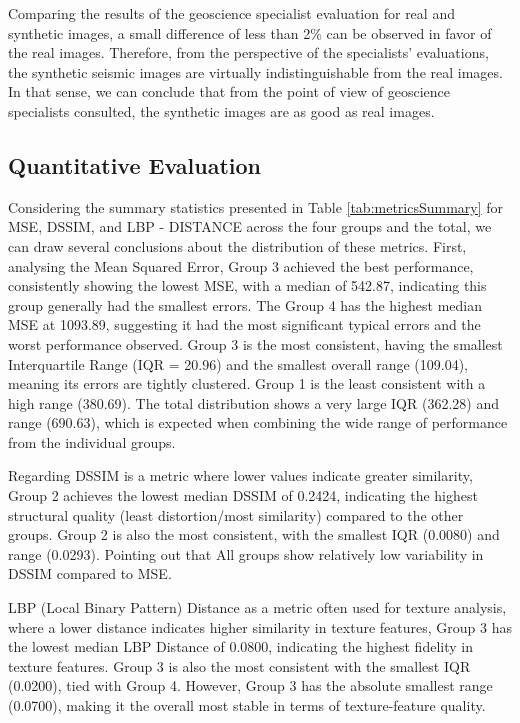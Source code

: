 \documentclass{ieeeaccess}
\begin{document}
Comparing the results of the geoscience specialist evaluation for real and synthetic images, a small difference of less than 2\% can be observed in favor of the real images. Therefore, from the perspective of the specialists' evaluations, the synthetic seismic images are virtually indistinguishable from the real images. In that sense, we can conclude that from the point of view of geoscience specialists consulted, the synthetic images are as good as real images.

\subsection{Quantitative Evaluation} 

Considering the summary statistics presented in Table \ref{tab:metricsSummary} for MSE, DSSIM, and LBP - DISTANCE across the four groups and the total, we can draw several conclusions about the distribution of these metrics. First, analysing the Mean Squared Error, Group 3 achieved the best performance, consistently showing the lowest MSE, with a median of 542.87, indicating this group generally had the smallest errors. The Group 4 has the highest median MSE at 1093.89, suggesting it had the most significant typical errors and the worst performance observed. Group 3 is the most consistent, having the smallest Interquartile Range (IQR = 20.96) and the smallest overall range (109.04), meaning its errors are tightly clustered. Group 1 is the least consistent with a high range (380.69). The total distribution shows a very large IQR (362.28) and range (690.63), which is expected when combining the wide range of performance from the individual groups.

Regarding DSSIM is a metric where lower values indicate greater similarity, Group 2 achieves the lowest median DSSIM of 0.2424, indicating the highest structural quality (least distortion/most similarity) compared to the other groups.  Group 2 is also the most consistent, with the smallest IQR (0.0080) and range (0.0293). Pointing out that All groups show relatively low variability in DSSIM compared to MSE.

LBP (Local Binary Pattern) Distance as a metric often used for texture analysis, where a lower distance indicates higher similarity in texture features, Group 3 has the lowest median LBP Distance of 0.0800, indicating the highest fidelity in texture features. Group 3 is also the most consistent with the smallest IQR (0.0200), tied with Group 4. However, Group 3 has the absolute smallest range (0.0700), making it the overall most stable in terms of texture-feature quality.
\end{document}

